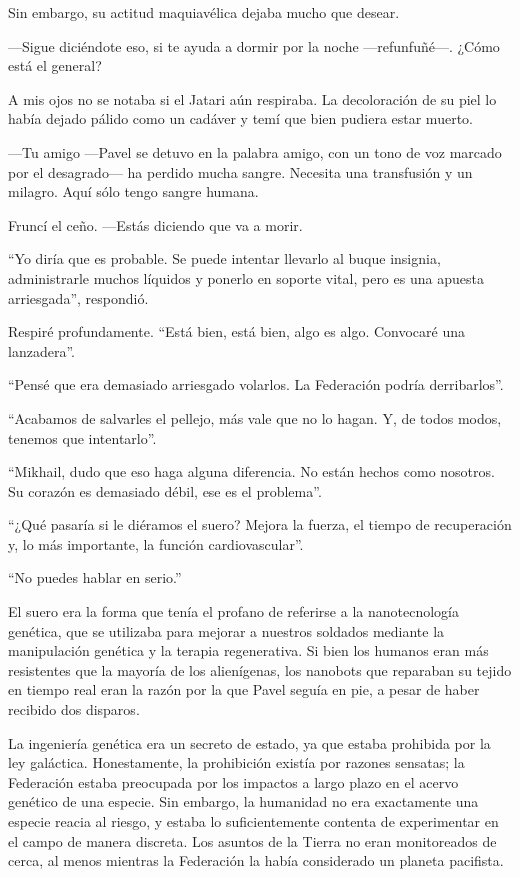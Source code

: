 Sin embargo, su actitud maquiavélica dejaba mucho que desear.

—Sigue diciéndote eso, si te ayuda a dormir por la noche —refunfuñé—. ¿Cómo está el general?

A mis ojos no se notaba si el Jatari aún respiraba. La decoloración de su piel lo había dejado pálido como un cadáver y temí que bien pudiera estar muerto.

—Tu amigo —Pavel se detuvo en la palabra amigo, con un tono de voz marcado por el desagrado— ha perdido mucha sangre. Necesita una transfusión y un milagro. Aquí sólo tengo sangre humana.

Fruncí el ceño. —Estás diciendo que va a morir.

``Yo diría que es probable. Se puede intentar llevarlo al buque insignia, administrarle muchos líquidos y ponerlo en soporte vital, pero es una apuesta arriesgada'', respondió.

Respiré profundamente. ``Está bien, está bien, algo es algo. Convocaré una lanzadera''.

``Pensé que era demasiado arriesgado volarlos. La Federación podría derribarlos''.

``Acabamos de salvarles el pellejo, más vale que no lo hagan. Y, de todos modos, tenemos que intentarlo''.

``Mikhail, dudo que eso haga alguna diferencia. No están hechos como nosotros. Su corazón es demasiado débil, ese es el problema''.

``¿Qué pasaría si le diéramos el suero? Mejora la fuerza, el tiempo de recuperación y, lo más importante, la función cardiovascular''.

``No puedes hablar en serio.''

El suero era la forma que tenía el profano de referirse a la nanotecnología genética, que se utilizaba para mejorar a nuestros soldados mediante la manipulación genética y la terapia regenerativa. Si bien los humanos eran más resistentes que la mayoría de los alienígenas, los nanobots que reparaban su tejido en tiempo real eran la razón por la que Pavel seguía en pie, a pesar de haber recibido dos disparos.

La ingeniería genética era un secreto de estado, ya que estaba prohibida por la ley galáctica. Honestamente, la prohibición existía por razones sensatas; la Federación estaba preocupada por los impactos a largo plazo en el acervo genético de una especie. Sin embargo, la humanidad no era exactamente una especie reacia al riesgo, y estaba lo suficientemente contenta de experimentar en el campo de manera discreta. Los asuntos de la Tierra no eran monitoreados de cerca, al menos mientras la Federación la había considerado un planeta pacifista.

